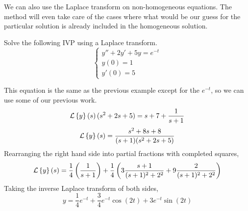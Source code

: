 \noindent
We can also use the Laplace transform on non-homogeneous equations. The method will even take care of the cases where what would be our guess for the particular solution is already included in the homogeneous solution.
\begin{example}
	Solve the following IVP using a Laplace transform.
	\begin{equation*}
		\begin{cases}
			y'' + 2y' + 5y = e^{-t} \\
			y(0) = 1 \\
			y'(0) = 5
		\end{cases}
	\end{equation*}
\end{example}
\noindent
This equation is the same as the previous example except for the $e^{-t}$, so we can use some of our previous work.
\begin{equation*}
	\mathcal{L}\left\{ y \right\}\left(s\right)(s^2 + 2s + 5) = s + 7 + \frac{1}{s+1}
\end{equation*}
\begin{equation*}
	 \mathcal{L}\left\{ y \right\}\left(s\right) = \frac{s^2 + 8s + 8}{(s+1)(s^2 + 2s + 5)}
\end{equation*}
Rearranging the right hand side into partial fractions with completed squares,
\begin{equation*}
	\mathcal{L}\left\{ y \right\}\left(s\right) = \frac{1}{4}\left(\frac{1}{s+1}\right) + \frac{1}{4}\left(3\frac{s+1}{(s+1)^2 + 2^2} + 9\frac{2}{(s+1)^2 + 2^2}\right)
\end{equation*}
Taking the inverse Laplace transform of both sides,
\begin{equation*}
	y = \frac{1}{4}e^{-t} + \frac{3}{4}e^{-t}\cos{(2t)} + 3e^{-t}\sin{(2t)}
\end{equation*}


